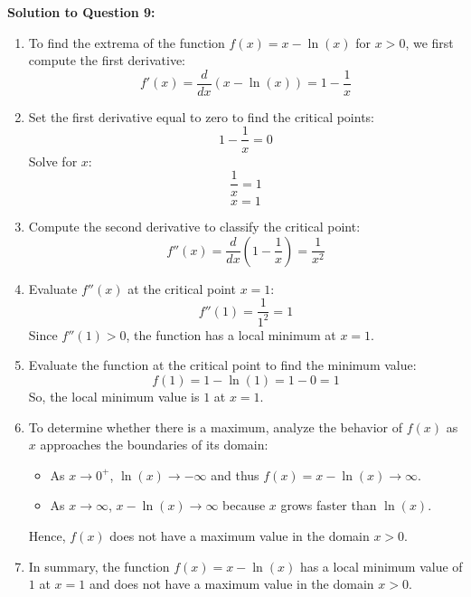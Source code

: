 \documentclass{article}
\begin{document}
    \item \textbf{Solution to Question 9:}
\begin{enumerate}[label=(\alph*), itemsep=10pt]
    \item To find the extrema of the function \( f(x) = x - \ln(x) \) for \( x > 0 \), we first compute the first derivative:
    \[
    f'(x) = \frac{d}{dx}\left(x - \ln(x)\right) = 1 - \frac{1}{x}
    \]

    \item Set the first derivative equal to zero to find the critical points:
    \[
    1 - \frac{1}{x} = 0
    \]
    Solve for \( x \):
    \[
    \frac{1}{x} = 1
    \]
    \[
    x = 1
    \]

    \item Compute the second derivative to classify the critical point:
    \[
    f''(x) = \frac{d}{dx}\left(1 - \frac{1}{x}\right) = \frac{1}{x^2}
    \]

    \item Evaluate \( f''(x) \) at the critical point \( x = 1 \):
    \[
    f''(1) = \frac{1}{1^2} = 1
    \]
    Since \( f''(1) > 0 \), the function has a local minimum at \( x = 1 \).

    \item Evaluate the function at the critical point to find the minimum value:
    \[
    f(1) = 1 - \ln(1) = 1 - 0 = 1
    \]
    So, the local minimum value is \( 1 \) at \( x = 1 \).

    \item To determine whether there is a maximum, analyze the behavior of \( f(x) \) as \( x \) approaches the boundaries of its domain:
    \begin{itemize}
        \item As \( x \to 0^+ \), \( \ln(x) \to -\infty \) and thus \( f(x) = x - \ln(x) \to \infty \).
        \item As \( x \to \infty \), \( x - \ln(x) \to \infty \) because \( x \) grows faster than \( \ln(x) \).
    \end{itemize}
    Hence, \( f(x) \) does not have a maximum value in the domain \( x > 0 \).

    \item In summary, the function \( f(x) = x - \ln(x) \) has a local minimum value of \( 1 \) at \( x = 1 \) and does not have a maximum value in the domain \( x > 0 \).
\end{enumerate}

    
\end{document}

